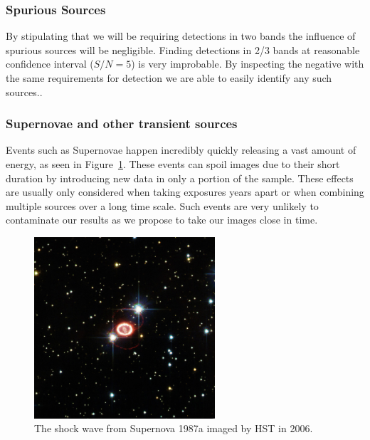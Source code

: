 		    \subsubsection*{Spurious Sources} %
		    \label{sub:spurious_sources}
		        By stipulating that we will be requiring detections in two bands the influence of spurious sources will be negligible. Finding detections in 2/3 bands at reasonable confidence interval ($S/N =5$) is very improbable. By inspecting the negative with the same requirements for detection we are able to easily identify any such sources.\cite{Bouwens2011}.

		    \subsubsection*{Supernovae and other transient sources} %
		    \label{sub:supernovae_and_other_transient_sources}
		        Events such as Supernovae happen incredibly quickly releasing a vast amount of energy, as seen in Figure~\ref{fig:SNe_1987a}. These events can spoil images due to their short duration by introducing new data in only a portion of the sample. These effects are usually only considered when taking exposures years apart or when combining multiple sources over a long time scale. Such events are very unlikely to contaminate our results as we propose to take our images close in time.
		        \begin{figure}[!htbp]
		            \centering
		            \includegraphics[width=0.6\textwidth]{../Images/SNe_1987a.jpg}
		            \caption{The shock wave from Supernova 1987a imaged by HST in 2006.\label{fig:SNe_1987a}}
		        \end{figure}

